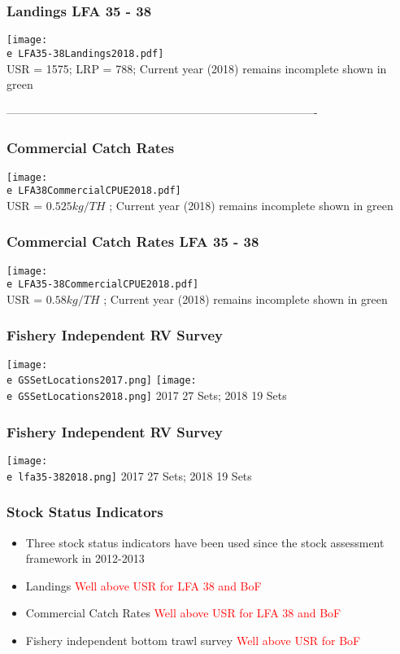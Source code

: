 \documentclass{beamer}
\newcommand{\e}{/SpinDr/backup/bio_data/bio.lobster/figures/}
\begin{document}
\begin{frame}
\frametitle{Landings LFA 35 - 38}
	\centering
	  \texttt{[image: \\e LFA35-38Landings2018.pdf]}\\[-1ex]
	{\tiny{USR = 1575; LRP = 788; Current year (2018) remains incomplete shown in green}}
\end{frame}

----------------------------------------------------------------------------------

\begin{frame}
\frametitle{Commercial Catch Rates}
	\centering
	  \texttt{[image: \\e LFA38CommercialCPUE2018.pdf]}\\[-1ex]
	{\tiny{USR = $0.525 kg/ TH$  ;  Current year (2018) remains incomplete shown in green}}
\end{frame}


\begin{frame}
\frametitle{Commercial Catch Rates LFA 35 - 38}
	\centering
	  \texttt{[image: \\e LFA35-38CommercialCPUE2018.pdf]}\\[-1ex]
	{\tiny{USR = $0.58 kg/ TH$  ;  Current year (2018) remains incomplete shown in green}}
\end{frame}

\clearpage
\begin{frame}
	\frametitle{Fishery Independent RV Survey}
		\centering
	  \texttt{[image: \\e GSSetLocations2017.png]}
	  \texttt{[image: \\e GSSetLocations2018.png]}
	  {\tiny{2017 27 Sets; 2018 19 Sets}}
\end{frame}


\begin{frame}
	\frametitle{Fishery Independent RV Survey}
		\centering
	  \texttt{[image: \\e lfa35-382018.png]}
	  {\tiny{2017 27 Sets; 2018 19 Sets}}
\end{frame}


\begin{frame}

	\frametitle{Stock Status Indicators}

	\begin{itemize}
		\item Three stock status indicators have been used since the stock assessment framework in 2012-2013
		\item Landings \textcolor{red}{Well above USR for LFA 38 and BoF}
		\item Commercial Catch Rates \textcolor{red}{Well above USR for LFA 38 and BoF}
		\item Fishery independent bottom trawl survey \textcolor{red}{Well above USR for BoF}
	\end{itemize}
\end{frame}
\end{document}
